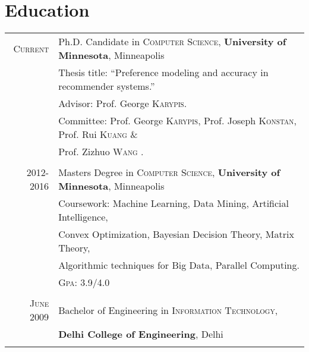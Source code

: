 \documentclass[a4paper,10pt]{article}
\begin{document}
\section{Education}
\begin{tabular}{r|l}	
 \textsc{Current}  & Ph.D. Candidate in \textsc{Computer Science},
  \textbf{University of Minnesota}, Minneapolis\\
 & Thesis title: ``Preference modeling and accuracy in
  recommender systems.''\\
  & \small Advisor: Prof. George \textsc{Karypis}. \\
  & \small Committee: Prof. George \textsc{Karypis}, Prof. Joseph
  \textsc{Konstan}, Prof. Rui \textsc{Kuang} \& \\
  & \small Prof. Zizhuo \textsc{Wang} . \\
  \multicolumn{2}{c}{}\\

  \textsc{2012-2016} & Masters Degree in \textsc{Computer Science},
  \textbf{University of Minnesota}, Minneapolis \\
                     &Coursework: Machine Learning, Data Mining, Artificial
  Intelligence,  \\
                   &Convex Optimization, Bayesian Decision Theory, Matrix
  Theory, \\ 
  &Algorithmic techniques for Big Data, Parallel Computing. \\
                     &\normalsize \textsc{Gpa}: 3.9/4.0 \\
                   \multicolumn{2}{c}{}\\ %

   
   \textsc{June} 2009& Bachelor of Engineering in \textsc{Information
      Technology}, \\
      &\textbf{Delhi College of Engineering}, Delhi\\
\multicolumn{2}{c}{}\\
\end{tabular}
\end{document}
